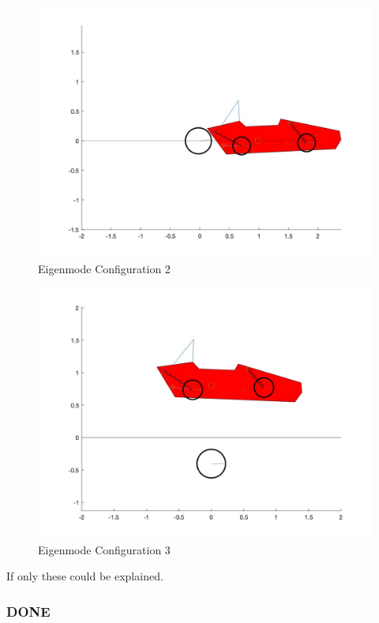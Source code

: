 \begin{figure}[ht]
    \centering
    \includegraphics[scale=0.235]{images/mode2.jpg}
    \caption{Eigenmode Configuration 2}
    \label{fig:mode_2}
\end{figure}

\begin{figure}[ht]
    \centering
    \includegraphics[scale=0.235]{images/mode3.jpg}
    \caption{Eigenmode Configuration 3}
    \label{fig:mode_3}
\end{figure}

If only these could be explained.

\subsubsection{DONE}
